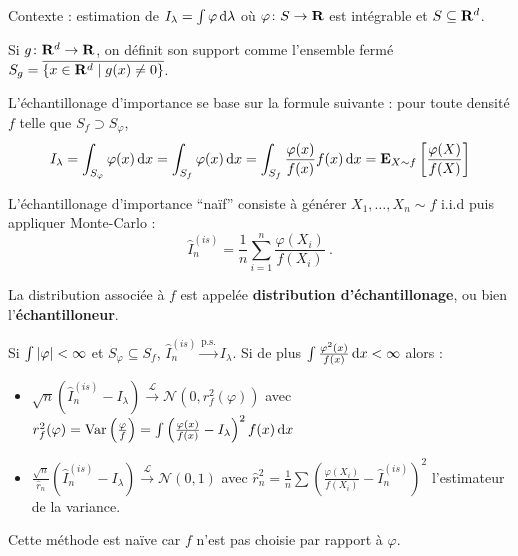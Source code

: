 Contexte : estimation de $I_\lambda = \int \varphi \mathop{}\mathopen{}\mathrm{d} \lambda$ où $\varphi \colon S \to \mathbf{R}$ est intégrable et $S \subseteq \mathbf{R}^d$.

\begin{defn}
	Si $g \colon \mathbf{R}^d \to \mathbf{R}$, on définit son support comme l'ensemble fermé $S_g = \overline{\{ x \in \mathbf{R}^d \mid g(x) \neq 0 \} }$.
\end{defn}

L'échantillonage d'importance se base sur la formule suivante : pour toute densité $f$ telle que $S_f \supset S_{\varphi}$,
$$I_\lambda = \int_{S_{\varphi}} \varphi(x) \mathop{}\mathopen{}\mathrm{d} x = \int_{S_f} \varphi(x) \mathop{}\mathopen{}\mathrm{d} x = \int_{S_f} \frac{\varphi(x)}{f(x)} f(x) \mathop{}\mathopen{}\mathrm{d} x = \mathbf{E}_{X \sim f} \left[  \frac{\varphi(X)}{f(X)} \right]$$

L'échantillonage d'importance “naïf” consiste à générer $X_1,\ldots,X_n \sim f$ i.i.d puis appliquer Monte-Carlo :
$$\hat{I}_n^{(is)} = \frac{1}{n} \sum_{i = 1}^n \frac{\varphi(X_i)}{f(X_i)}\ .$$

\noindent La distribution associée à $f$ est appelée \textbf{distribution d'échantillonage}, ou bien l'\textbf{échantilloneur}.

\begin{pop}
	Si $\int \left\lvert\varphi\right\rvert < \infty$ et $S_\varphi \subseteq S_f$, $\hat{I}_n^{(is)} \overset{\text{p.s.}}{\longrightarrow} I_\lambda$.
	Si de plus $\int \frac{\varphi^2(x)}{f(x)} \mathop{}\mathopen{}\mathrm{d} x < \infty$ alors :
	\begin{itemize}
		\item[\textbullet] $\sqrt{n} \left( \hat{I}_n^{(is)} - I_\lambda \right) \overset{\mathcal{L}}{\longrightarrow} \mathcal{N} \left(0,r_f^2(\varphi) \right)$ avec $r_f^2(\varphi) = \operatorname{Var} \left( \frac{\varphi}{f} \right) = \int \left( \frac{\varphi(x)}{f(x)} - I_\lambda \right)^2 f(x) \mathop{}\mathopen{}\mathrm{d} x$
		\item[\textbullet] $\frac{\sqrt{n}}{\hat{r}_n} \left( \hat{I}_n^{(is)} - I_\lambda \right) \overset{\mathcal{L}}{\longrightarrow} \mathcal{N}(0,1)$ avec $\hat{r}_n^2 = \frac{1}{n} \sum \left( \frac{\varphi(X_i)}{f(X_i)} - \hat{I}_n^{(is)} \right)^2$ l'estimateur de la variance.
	\end{itemize}
\end{pop}

Cette méthode est naïve car $f$ n'est pas choisie par rapport à $\varphi$.

